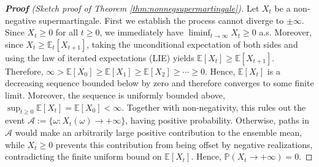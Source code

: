 \documentclass[12pt]{article}
\begin{document}
\begin{proof}[\textbf{Proof} (Sketch proof of Theorem \ref{thm:nonnegsupermartingale})]
Let $X_t$ be a non-negative supermartingale. First we establish the process cannot diverge to 
$\pm\infty$. Since $X_t\geq0$ for all $t\geq0$, we immediately have $\liminf_{t\to\infty} 
X_t \geq 0$ a.s. Moreover, since $X_t\geq\mathbb{E}_t[X_{t+1}]$, taking the unconditional 
expectation of both sides and using the law of iterated expectations (LIE) yields 
$\mathbb{E}[X_t]\geq\mathbb{E}[X_{t+1}]$.
Therefore, $\infty>\mathbb{E}[X_0]\geq\mathbb{E}[X_1]\geq\mathbb{E}[X_2]\geq\cdots\geq0$.
Hence, $\mathbb{E}[X_t]$ is a decreasing sequence bounded below by zero 
and therefore converges to some finite limit. Moreover, the sequence is uniformly bounded
above, $\sup_{t\geq0}\mathbb{E}[X_t]=\mathbb{E}[X_0]<\infty$. Together with non-negativity, 
this rules out the event $\mathcal{A}:=\{\omega:X_t(\omega)\to+\infty\}$, having positive
probability. Otherwise, paths in $\mathcal{A}$ would make an arbitrarily large positive 
contribution to the ensemble mean, while $X_t\geq0$ prevents this contribution from being 
offset by negative realizations, contradicting the finite uniform bound on $\mathbb{E}[X_t]$.
Hence, $\mathbb{P}(X_t\to+\infty)=0$. 


\end{proof}
\end{document}
